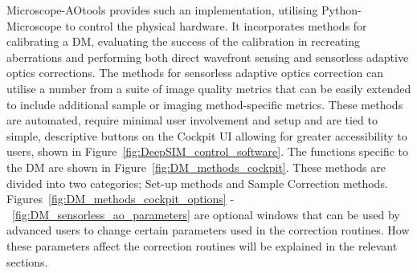Microscope-AOtools provides such an implementation, utilising Python-Microscope to control the physical hardware. It incorporates methods for calibrating a DM, evaluating the success of the calibration in recreating aberrations and performing both direct wavefront sensing and sensorless adaptive optics corrections. The methods for sensorless adaptive optics correction can utilise a number from a suite of image quality metrics that can be easily extended to include additional sample or imaging method-specific metrics. These methods are automated, require minimal user involvement and setup and are tied to simple, descriptive  buttons on the Cockpit UI allowing for greater accessibility to users, shown in Figure~\ref{fig:DeepSIM_control_software}. The functions specific to the DM are shown in Figure~\ref{fig:DM_methods_cockpit}. These methods are divided into two categories; Set-up methods and Sample Correction methods. Figures~\ref{fig:DM_methods_cockpit_options} -~\ref{fig:DM_sensorless_ao_parameters} are optional windows that can be used by advanced users to change certain parameters used in the correction routines. How these parameters affect the correction routines will be explained in the relevant sections.

